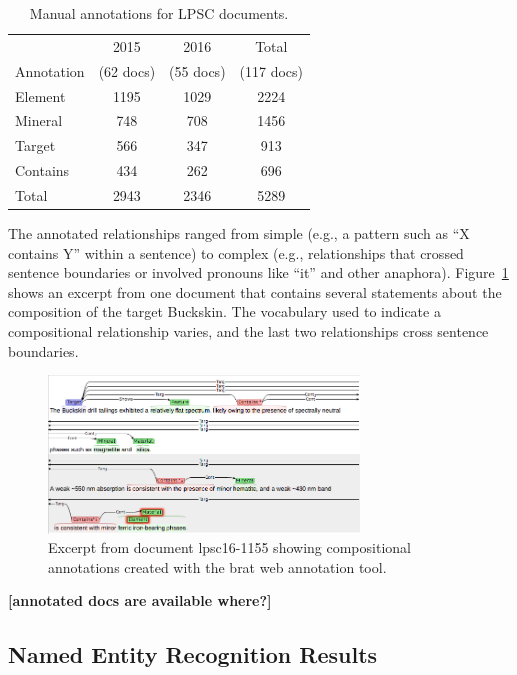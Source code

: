 \documentclass[letterpaper]{article} %
\begin{document}
\begin{table}
\caption{Manual annotations for LPSC documents.}
\label{tab:docs}
\begin{center}
\begin{tabular}{l|ccc}
           & 2015     & 2016     & Total \\ 
Annotation & (62 docs) & (55 docs) & (117 docs)\\ \hline
Element  & 1195 & 1029 & 2224 \\
Mineral  & 748  & 708  & 1456 \\
Target   & 566  & 347  &  913 \\ \hline
Contains & 434  & 262  &  696 \\ \hline
Total    & 2943 & 2346 & 5289 \\ \hline
\end{tabular}
\end{center}
\end{table}

The annotated relationships ranged from simple (e.g., a pattern such
as ``X contains Y'' within a sentence) to complex (e.g., relationships
that crossed sentence boundaries or involved pronouns like ``it'' and
other anaphora).  Figure~\ref{fig:brat} shows an excerpt from one
document that contains several statements about the composition of the
target Buckskin.  The vocabulary used to indicate a compositional
relationship varies, and the last two relationships cross sentence
boundaries.  

\begin{figure}
\begin{center}
\includegraphics[width=3.25in]{fig/brat-example.png}
\end{center}
\caption{Excerpt from document lpsc16-1155 showing compositional
annotations created with the brat web annotation tool.}
\label{fig:brat}
\end{figure}

{\bf [annotated docs are available where?]}

\subsection{Named Entity Recognition Results}
\end{document}
